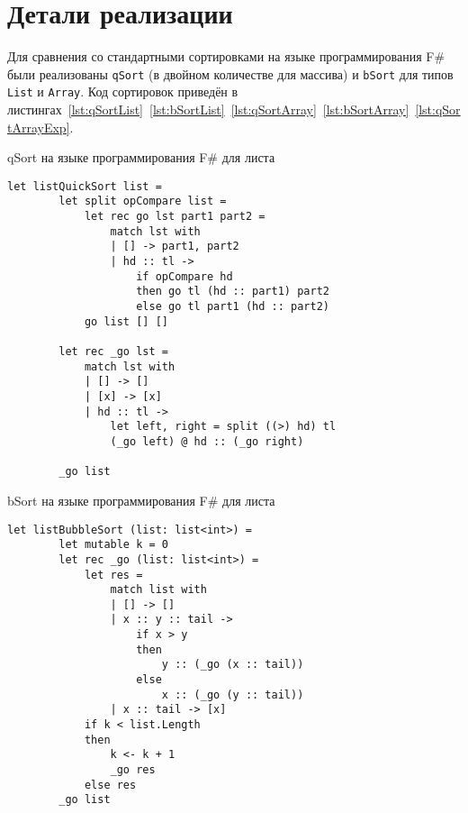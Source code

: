 \section{Детали реализации}

Для сравнения со стандартными сортировками на языке программирования F\# были реализованы \verb|qSort| (в двойном количестве для массива) и \verb|bSort| для типов \verb|List| и \verb|Array|. 
Код сортировок приведён в листингах~\ref{lst:qSortList}~\ref{lst:bSortList}~\ref{lst:qSortArray}~\ref{lst:bSortArray}~\ref{lst:qSortArrayExp}.


\begin{algorithm}[H]
\caption{qSort на языке программирования F\# для листа}
\label{lst:qSortList}
\begin{verbatim}
let listQuickSort list =
        let split opCompare list =
            let rec go lst part1 part2 =
                match lst with
                | [] -> part1, part2
                | hd :: tl ->
                    if opCompare hd
                    then go tl (hd :: part1) part2
                    else go tl part1 (hd :: part2)
            go list [] []

        let rec _go lst =
            match lst with
            | [] -> []
            | [x] -> [x]
            | hd :: tl ->
                let left, right = split ((>) hd) tl
                (_go left) @ hd :: (_go right)

        _go list
\end{verbatim}
\end{algorithm}
\begin{algorithm}[H]
\caption{bSort на языке программирования F\# для листа}
\label{lst:bSortList}
\begin{verbatim}
let listBubbleSort (list: list<int>) =
        let mutable k = 0
        let rec _go (list: list<int>) =
            let res =
                match list with
                | [] -> []
                | x :: y :: tail ->
                    if x > y
                    then
                        y :: (_go (x :: tail))
                    else
                        x :: (_go (y :: tail))
                | x :: tail -> [x]
            if k < list.Length
            then
                k <- k + 1
                _go res
            else res
        _go list
\end{verbatim}
\end{algorithm}
